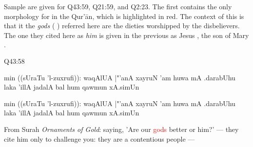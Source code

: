 Sample   are given for Q43:59, Q21:59, and Q2:23. The first   contains the only morphology for   in the Qur'\=an, which is highlighted in red. The context of this   is that it the \textit{gods} ( ) referred here are the dieties worshipped by the disbelievers. The one they cited here as \textit{him} is given in the previous    as Jesus , the son of Mary . 

\begin{bottomtitledframe}{Q43:58}
    \begin{center}
        \begin{arab}[fullvoc]
            min ((sUraTu 'l-zuxrufi)): waqAlUA |"'anA xayruN 'am huwa mA .darabUhu laka 'illA jadalA bal hum qawmun xA.simUn
        \end{arab}
        \begin{arab}[trans]
            min ((sUraTu 'l-zuxrufi)): waqAlUA |"'anA xayruN 'am huwa mA .darabUhu laka 'illA jadalA bal hum qawmun xA.simUn
        \end{arab}
    \end{center}
    From Surah \textit{Ornaments of Gold}: saying, 'Are our \textcolor{red}{gods} better or him?' --- they cite him only to challenge you: they are a contentious people ---
\end{bottomtitledframe}

